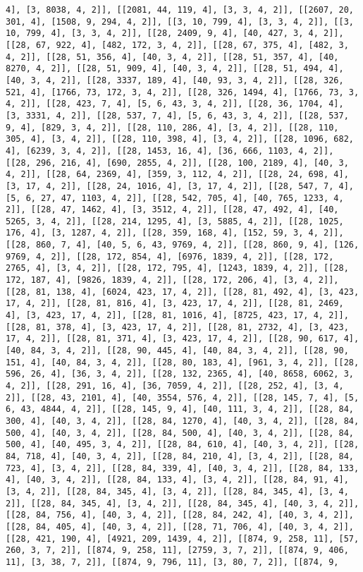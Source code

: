 \documentclass[12pt,fleqn]{article}\usepackage{../../common}
\begin{document}
\begin{verbatim}
4], [3, 8038, 4, 2]], [[2081, 44, 119, 4], [3, 3, 4, 2]], [[2607, 20, 301, 4], [1508, 9, 294, 4, 2]], [[3, 10, 799, 4], [3, 3, 4, 2]], [[3, 10, 799, 4], [3, 3, 4, 2]], [[28, 2409, 9, 4], [40, 427, 3, 4, 2]], [[28, 67, 922, 4], [482, 172, 3, 4, 2]], [[28, 67, 375, 4], [482, 3, 4, 2]], [[28, 51, 356, 4], [40, 3, 4, 2]], [[28, 51, 357, 4], [40, 8270, 4, 2]], [[28, 51, 909, 4], [40, 3, 4, 2]], [[28, 51, 494, 4], [40, 3, 4, 2]], [[28, 3337, 189, 4], [40, 93, 3, 4, 2]], [[28, 326, 521, 4], [1766, 73, 172, 3, 4, 2]], [[28, 326, 1494, 4], [1766, 73, 3, 4, 2]], [[28, 423, 7, 4], [5, 6, 43, 3, 4, 2]], [[28, 36, 1704, 4], [3, 3331, 4, 2]], [[28, 537, 7, 4], [5, 6, 43, 3, 4, 2]], [[28, 537, 9, 4], [829, 3, 4, 2]], [[28, 110, 286, 4], [3, 4, 2]], [[28, 110, 305, 4], [3, 4, 2]], [[28, 110, 398, 4], [3, 4, 2]], [[28, 1096, 682, 4], [6239, 3, 4, 2]], [[28, 1453, 16, 4], [36, 666, 1103, 4, 2]], [[28, 296, 216, 4], [690, 2855, 4, 2]], [[28, 100, 2189, 4], [40, 3, 4, 2]], [[28, 64, 2369, 4], [359, 3, 112, 4, 2]], [[28, 24, 698, 4], [3, 17, 4, 2]], [[28, 24, 1016, 4], [3, 17, 4, 2]], [[28, 547, 7, 4], [5, 6, 27, 47, 1103, 4, 2]], [[28, 542, 705, 4], [40, 765, 1233, 4, 2]], [[28, 47, 1462, 4], [3, 3512, 4, 2]], [[28, 47, 492, 4], [40, 5265, 3, 4, 2]], [[28, 214, 1295, 4], [3, 5885, 4, 2]], [[28, 1025, 176, 4], [3, 1287, 4, 2]], [[28, 359, 168, 4], [152, 59, 3, 4, 2]], [[28, 860, 7, 4], [40, 5, 6, 43, 9769, 4, 2]], [[28, 860, 9, 4], [126, 9769, 4, 2]], [[28, 172, 854, 4], [6976, 1839, 4, 2]], [[28, 172, 2765, 4], [3, 4, 2]], [[28, 172, 795, 4], [1243, 1839, 4, 2]], [[28, 172, 187, 4], [9826, 1839, 4, 2]], [[28, 172, 206, 4], [3, 4, 2]], [[28, 81, 138, 4], [6024, 423, 17, 4, 2]], [[28, 81, 492, 4], [3, 423, 17, 4, 2]], [[28, 81, 816, 4], [3, 423, 17, 4, 2]], [[28, 81, 2469, 4], [3, 423, 17, 4, 2]], [[28, 81, 1016, 4], [8725, 423, 17, 4, 2]], [[28, 81, 378, 4], [3, 423, 17, 4, 2]], [[28, 81, 2732, 4], [3, 423, 17, 4, 2]], [[28, 81, 371, 4], [3, 423, 17, 4, 2]], [[28, 90, 617, 4], [40, 84, 3, 4, 2]], [[28, 90, 445, 4], [40, 84, 3, 4, 2]], [[28, 90, 151, 4], [40, 84, 3, 4, 2]], [[28, 80, 183, 4], [961, 3, 4, 2]], [[28, 596, 26, 4], [36, 3, 4, 2]], [[28, 132, 2365, 4], [40, 8658, 6062, 3, 4, 2]], [[28, 291, 16, 4], [36, 7059, 4, 2]], [[28, 252, 4], [3, 4, 2]], [[28, 43, 2101, 4], [40, 3554, 576, 4, 2]], [[28, 145, 7, 4], [5, 6, 43, 4844, 4, 2]], [[28, 145, 9, 4], [40, 111, 3, 4, 2]], [[28, 84, 300, 4], [40, 3, 4, 2]], [[28, 84, 1270, 4], [40, 3, 4, 2]], [[28, 84, 500, 4], [40, 3, 4, 2]], [[28, 84, 500, 4], [40, 3, 4, 2]], [[28, 84, 500, 4], [40, 495, 3, 4, 2]], [[28, 84, 610, 4], [40, 3, 4, 2]], [[28, 84, 718, 4], [40, 3, 4, 2]], [[28, 84, 210, 4], [3, 4, 2]], [[28, 84, 723, 4], [3, 4, 2]], [[28, 84, 339, 4], [40, 3, 4, 2]], [[28, 84, 133, 4], [40, 3, 4, 2]], [[28, 84, 133, 4], [3, 4, 2]], [[28, 84, 91, 4], [3, 4, 2]], [[28, 84, 345, 4], [3, 4, 2]], [[28, 84, 345, 4], [3, 4, 2]], [[28, 84, 345, 4], [3, 4, 2]], [[28, 84, 345, 4], [40, 3, 4, 2]], [[28, 84, 756, 4], [40, 3, 4, 2]], [[28, 84, 242, 4], [40, 3, 4, 2]], [[28, 84, 405, 4], [40, 3, 4, 2]], [[28, 71, 706, 4], [40, 3, 4, 2]], [[28, 421, 190, 4], [4921, 209, 1439, 4, 2]], [[874, 9, 258, 11], [57, 260, 3, 7, 2]], [[874, 9, 258, 11], [2759, 3, 7, 2]], [[874, 9, 406, 11], [3, 38, 7, 2]], [[874, 9, 796, 11], [3, 80, 7, 2]], [[874, 9, 
\end{verbatim}
\end{document}
